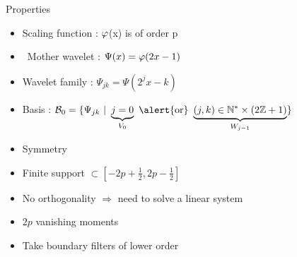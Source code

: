     \begin{frame}{Properties} 

        \begin{itemize}
            \item<1->  Scaling function : $\P$(x) is of order p
            \item<2->  Mother wavelet : $\Psi(x) = \P(2x - 1)$
            \item<3->  Wavelet family : $\Psi_{jk} = \Psi(2^j x - k)$
            \item<4->  Basis : $\mathcal{B}_0 = \{ \Psi_{jk}\ |\ \underbrace{j = 0}_{V_0} \textrm{ \alert{or} } \underbrace{(j,k) \in \N^* \times (2\Z + 1)}_{W_{j-1}} \}$
        \end{itemize}


        \begin{itemize}
            \item<5-> Symmetry
            \item<6-> Finite support $\subset [-2p+\frac{1}{2}, 2p-\frac{1}{2} ]$
            \item<7-> \alert{No orthogonality} $\Rightarrow$ need to solve a linear system
            \item<8-> $2p$ vanishing moments
        \end{itemize}

        \begin{itemize}
            \item<9-> Take \alert{boundary filters of lower order}
        \end{itemize}

    \end{frame}

